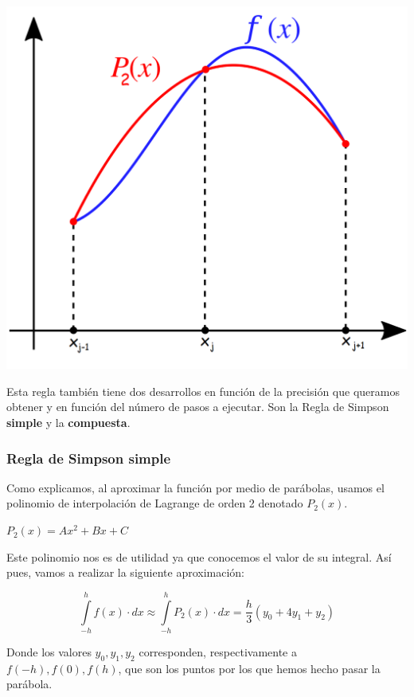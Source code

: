 \documentclass[12pt]{article}
\begin{document}
\begin{center}
\includegraphics[scale=0.26]{intro}
\end{center}

Esta regla también tiene dos desarrollos en función de la precisión que queramos obtener y en función del número de pasos a ejecutar. Son la Regla de Simpson \textbf{simple} y la \textbf{compuesta}.

\subsubsection{Regla de Simpson simple}

Como explicamos, al aproximar la función por medio de parábolas, usamos el polinomio de interpolación de Lagrange de orden 2 denotado $P_2(x)$.

\begin{center}
$P_2(x)=Ax^2+Bx+C$
\end{center}

Este polinomio nos es de utilidad ya que conocemos el valor de su integral. Así pues, vamos a realizar la siguiente aproximación:

\begin{equation}\label{eq:rss}
\int \limits_{-h}^{h} f(x) \cdot dx \approx 
\int \limits_{-h}^{h} P_2(x) \cdot dx =
\frac{h}{3}(y_0+4y_1+y_2)
\end{equation}

Donde los valores $y_0, y_1, y_2$ corresponden, respectivamente a $f(-h), f(0), f(h)$, que son los puntos por los que hemos hecho pasar la parábola.\\
\end{document}
